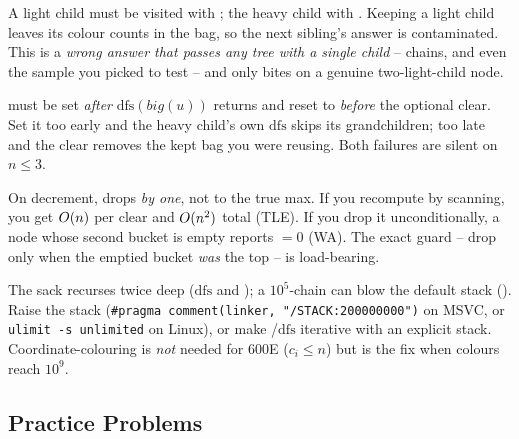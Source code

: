 \begin{warningbox}
A light child must be visited with ; the heavy child with
.  Keeping a light child leaves its colour counts in the bag, so
the next sibling's answer is contaminated.  This is a \emph{wrong answer that
passes any tree with a single child} -- chains, and even the sample you picked
to test -- and only bites on a genuine two-light-child node.
\end{warningbox}

\begin{warningbox}
 must be set \emph{after} \(\mathrm{dfs}(\mathit{big}(u))\)
returns and reset to  \emph{before} the optional clear.  Set it too early
and the heavy child's own \(\mathrm{dfs}\) skips its grandchildren; too late and
the clear removes the kept bag you were reusing.  Both failures are silent on
\(n\le3\).
\end{warningbox}

\begin{warningbox}
On decrement,  drops \emph{by one}, not to the true max.  If you
recompute  by scanning, you get \(O(n)\) per clear and
\(O(n^2)\) total (TLE).  If you drop it unconditionally, a node whose second
bucket is empty reports \(=0\) (WA).  The exact guard --
drop only when the emptied bucket \emph{was} the top -- is load-bearing.
\end{warningbox}

\begin{hardeningbox}
The sack recurses twice deep (\(\mathrm{dfs}\) and ); a
\(10^5\)-chain can blow the default stack (\re).  Raise the stack
(\texttt{\#pragma comment(linker, "/STACK:200000000")} on MSVC, or
\texttt{ulimit -s unlimited} on Linux), or make /\(\mathrm{dfs}\)
iterative with an explicit stack.  Coordinate-colouring is \emph{not} needed for
600E (\(c_i\le n\)) but is the fix when colours reach \(10^9\).
\end{hardeningbox}

\subsection{Practice Problems}

